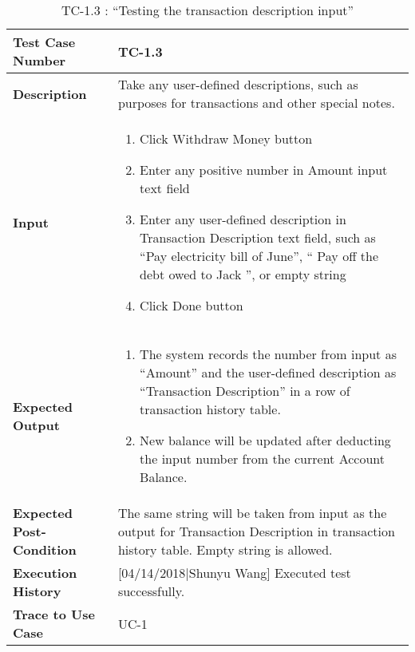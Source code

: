 \documentclass[12pt]{article}
\begin{document}
\begin{table}[H]
\caption{TC-1.3 : “Testing the transaction description input”}
\begin{center}
\begin{tabular}{|p{5 cm}|p{12cm}|}
\hline
\bf Test Case Number & 
TC-1.3 \\
\hline
\bf Description & 
Take any user-defined descriptions, such as purposes for transactions and other special notes.\\
\hline
\bf Input & 
\begin{enumerate}
  \item Click Withdraw Money button
  \item Enter any positive number in Amount input text field
  \item Enter any user-defined description in Transaction Description text field, such as “Pay electricity bill of June”, “ Pay off the debt owed to Jack
”, or empty string
  \item Click Done button
\end{enumerate} \\
\hline
\bf Expected Output & 
\begin{enumerate}
  \item The system records the number from input as “Amount” and the user-defined description as “Transaction Description” in a row of transaction history table.
  \item New balance will be updated after deducting the input number from the current Account Balance.
\end{enumerate} \\
\hline
\bf Expected Post-Condition & 
The same string will be taken from input as the output for Transaction Description in transaction history table. Empty string is allowed.\\
\hline
\bf Execution History & 
[04/14/2018|Shunyu Wang] Executed test successfully.\\
\hline
\bf Trace to Use Case & 
UC-1\\
\hline

\end{tabular}
\end{center}
\end{table}
\end{document}
